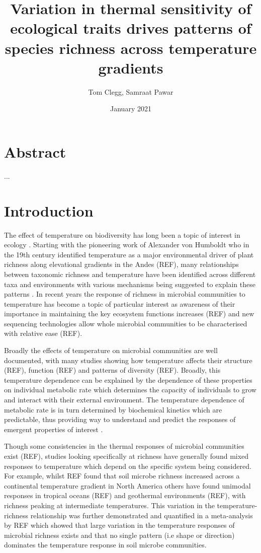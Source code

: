 \documentclass{article}
\title{Variation in thermal sensitivity of ecological traits drives patterns of species richness across temperature gradients}
\author{Tom Clegg, Samraat Pawar}
\date{January 2021}
\begin{document}
\maketitle

\section*{Abstract}

...

\section*{Introduction}

The effect of temperature on biodiversity has long been a topic of interest in ecology \citep{Gaston2000}. Starting with the pioneering work of Alexander von Humboldt who in the 19th century identified temperature as a major environmental driver of plant richness along elevational gradients in the Andes (REF), many relationships between taxonomic richness and temperature have been identified across different taxa and environments with various mechanisms being suggested to explain these patterns \citep{Rohde1992,Gaston2000}. In recent years the response of richness in microbial communities to temperature has become a topic of particular interest as awareness of their importance in maintaining the key ecosystem functions increases (REF) and new sequencing technologies allow whole microbial communities to be characterised with relative ease (REF).  

Broadly the effects of temperature on microbial communities are well documented, with many studies showing how temperature affects their structure (REF), function (REF) and patterns of diversity (REF). Broadly, this temperature dependence can be explained by the dependence of these properties on individual metabolic rate which determines the capacity of individuals to grow and interact with their external environment. The temperature dependence of metabolic rate is in turn determined by biochemical kinetics which are predictable, thus providing way to understand and predict the responses of emergent properties of interest \cite{Gillooly2001,Brown2004}. 

Though some consistencies in the thermal responses of microbial communities exist (REF), studies looking specifically at richness have generally found mixed responses to temperature which depend on the specific system being considered. For example, whilst REF found that soil microbe richness increased across a continental temperature gradient in North America others have found unimodal responses in tropical oceans (REF) and geothermal environments (REF), with richness peaking at intermediate temperatures. This variation in the temperature-richness relationship was further demonstrated and quantified in a meta-analysis by REF which showed that large variation in the temperature responses of microbial richness exists and that no single pattern (i.e shape or direction) dominates the temperature response in soil microbe communities. 
\end{document}
